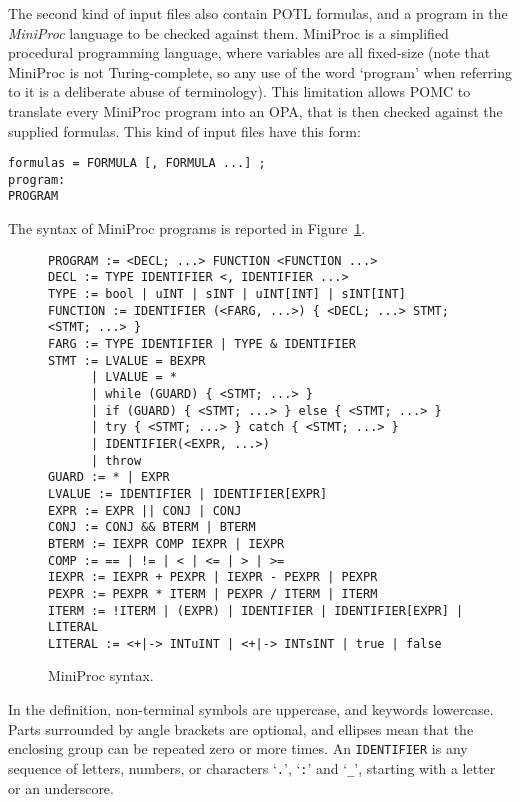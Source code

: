 \documentclass[9pt,a4paper]{article}
\begin{document}
The second kind of input files also contain POTL formulas,
and a program in the \emph{MiniProc} language to be checked against them.
MiniProc is a simplified procedural programming language,
where variables are all fixed-size (note that MiniProc is not Turing-complete,
so any use of the word `program' when referring to it is a deliberate abuse of terminology).
This limitation allows POMC to translate every MiniProc program into an OPA,
that is then checked against the supplied formulas.
This kind of input files have this form:
\begin{verbatim}
formulas = FORMULA [, FORMULA ...] ;
program:
PROGRAM
\end{verbatim}
The syntax of MiniProc programs is reported in Figure~\ref{fig:miniproc-syntax}.
\begin{figure}
\begin{verbatim}
PROGRAM := <DECL; ...> FUNCTION <FUNCTION ...>
DECL := TYPE IDENTIFIER <, IDENTIFIER ...>
TYPE := bool | uINT | sINT | uINT[INT] | sINT[INT]
FUNCTION := IDENTIFIER (<FARG, ...>) { <DECL; ...> STMT; <STMT; ...> }
FARG := TYPE IDENTIFIER | TYPE & IDENTIFIER
STMT := LVALUE = BEXPR
      | LVALUE = *
      | while (GUARD) { <STMT; ...> }
      | if (GUARD) { <STMT; ...> } else { <STMT; ...> }
      | try { <STMT; ...> } catch { <STMT; ...> }
      | IDENTIFIER(<EXPR, ...>)
      | throw
GUARD := * | EXPR
LVALUE := IDENTIFIER | IDENTIFIER[EXPR]
EXPR := EXPR || CONJ | CONJ
CONJ := CONJ && BTERM | BTERM
BTERM := IEXPR COMP IEXPR | IEXPR
COMP := == | != | < | <= | > | >=
IEXPR := IEXPR + PEXPR | IEXPR - PEXPR | PEXPR
PEXPR := PEXPR * ITERM | PEXPR / ITERM | ITERM
ITERM := !ITERM | (EXPR) | IDENTIFIER | IDENTIFIER[EXPR] | LITERAL
LITERAL := <+|-> INTuINT | <+|-> INTsINT | true | false
\end{verbatim}
\caption{MiniProc syntax.}
\label{fig:miniproc-syntax}
\end{figure}
In the definition, non-terminal symbols are uppercase, and keywords lowercase.
Parts surrounded by angle brackets are optional, and ellipses mean that the enclosing
group can be repeated zero or more times.
An \texttt{IDENTIFIER} is any sequence of letters, numbers, or characters `\texttt{.}',
`\texttt{:}' and `\texttt{\_}', starting with a letter or an underscore.
\end{document}
